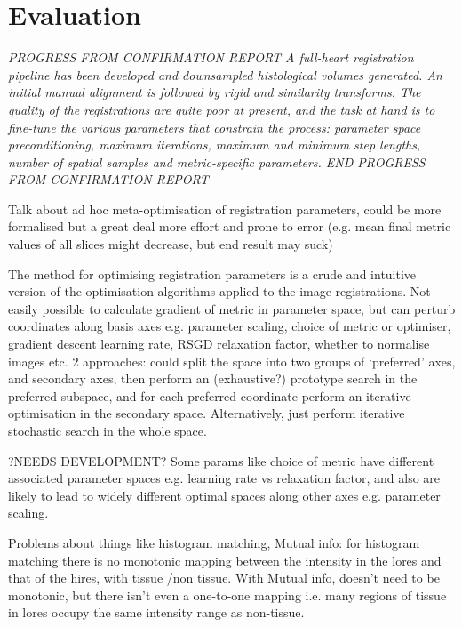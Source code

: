 \section{Evaluation} %
\label{sec:evaluation}

\textit{PROGRESS FROM CONFIRMATION REPORT 
A full-heart registration pipeline has been developed and downsampled histological volumes generated. An initial manual alignment is followed by rigid and similarity transforms. The quality of the registrations are quite poor at present, and the task at hand is to fine-tune the various parameters that constrain the process: parameter space preconditioning, maximum iterations, maximum and minimum step lengths, number of spatial samples and metric-specific parameters.
END PROGRESS FROM CONFIRMATION REPORT
}

    Talk about ad hoc meta-optimisation of registration parameters, could be more formalised but a great deal more effort and prone to error (e.g. mean final metric values of all slices might decrease, but end result may suck)
    
    The method for optimising registration parameters is a crude and intuitive version of the optimisation algorithms applied to the image registrations. Not easily possible to calculate gradient of metric in parameter space, but can perturb coordinates along basis axes e.g. parameter scaling, choice of metric or optimiser, gradient descent learning rate, RSGD relaxation factor, whether to normalise images etc. 2 approaches: could split the space into two groups of `preferred' axes, and secondary axes, then perform an (exhaustive?) prototype search in the preferred subspace, and for each preferred coordinate perform an iterative optimisation in the secondary space. Alternatively, just perform iterative stochastic search in the whole space.
    
    ?NEEDS DEVELOPMENT? Some params like choice of metric have different associated parameter spaces e.g. learning rate vs relaxation factor, and also are likely to lead to widely different optimal spaces along other axes e.g. parameter scaling.
    
    Problems about things like histogram matching, Mutual info: for histogram matching there is no monotonic mapping between the intensity in the lores and that of the hires, with tissue /non tissue. With Mutual info, doesn't need to be monotonic, but there isn't even a one-to-one mapping i.e. many regions of tissue in lores occupy the same intensity range as non-tissue.

